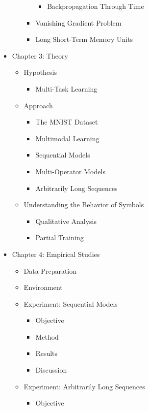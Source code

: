 \documentclass{article}
\begin{document}
\begin{itemize}
\begin{itemize}
\begin{itemize}
\begin{itemize}
					\item Backpropagation Through Time
				\end{itemize}
				\item Vanishing Gradient Problem
				\item Long Short-Term Memory Units
			\end{itemize}
		\end{itemize}
		\item Chapter 3: Theory
		\begin{itemize}
			\item Hypothesis
			\begin{itemize}
				\item Multi-Task Learning
			\end{itemize}
			\item Approach
			\begin{itemize}
				\item The MNIST Dataset
				\item Multimodal Learning
				\item Sequential Models
				\item Multi-Operator Models
				\item Arbitrarily Long Sequences
			\end{itemize}
			\item Understanding the Behavior of Symbols
			\begin{itemize}
				\item Qualitative Analysis
				\item Partial Training
			\end{itemize}
		\end{itemize}
		\item Chapter 4: Empirical Studies
		\begin{itemize}
			\item Data Preparation
			\item Environment
			\item Experiment: Sequential Models
			\begin{itemize}
				\item Objective
				\item Method
				\item Results
				\item Discussion
			\end{itemize}
			\item Experiment: Arbitrarily Long Sequences
			\begin{itemize}
				\item Objective

\end{itemize}
\end{itemize}
\end{itemize}
\end{document}
